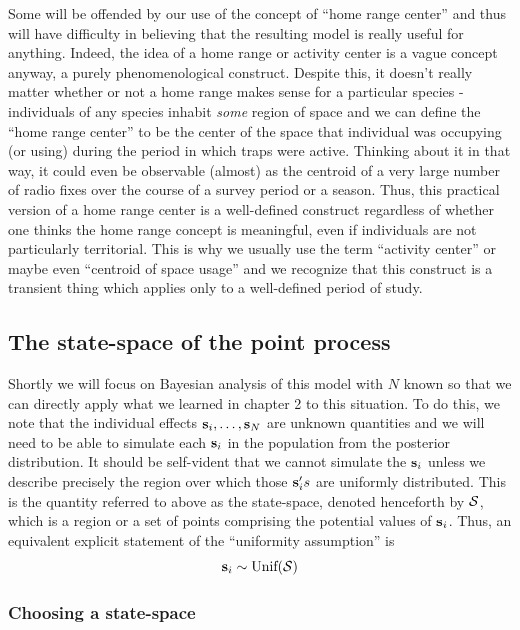 Some will be offended by our use of the concept of ``home range
center'' and thus will have difficulty in believing that the resulting
model is really useful for anything.  Indeed, the idea of a home range
or activity center is a vague concept anyway, a purely
phenomenological construct.  Despite this, it doesn't really matter
whether or not a home range makes sense for a particular species -
individuals of any species inhabit {\it some} region of space and we
can define the ``home range center'' to be the center of the space
that individual was occupying (or using) during the period in which
traps were active. Thinking about it in that way, it could even be
observable (almost) as the centroid of a very large number of radio
fixes over the course of a survey period or a season.  Thus, this
practical version of a home range center is a well-defined construct
regardless of whether one thinks the home range concept is meaningful,
even if individuals are not particularly territorial.  This is why we
usually use the term ``activity center'' or maybe even ``centroid of
space usage'' and we recognize that this construct is a transient
thing which applies only to a well-defined period of
study. 



\subsection{The state-space of the point process}

Shortly we will focus on Bayesian analysis of this model with $N$
known so that we can directly apply what we learned in chapter 2 to
this situation. To do this, we note that the individual effects ${\bf
  s}_{i},\ldots, {\bf s}_{N}$ are unknown quantities and we will need
to be able to simulate each ${\bf s}_{i}$ in the population from the
posterior distribution.  It should be self-vident that we cannot
simulate the ${\bf s}_{i}$ unless we describe precisely the region
over which those ${\bf s}_{i}'s$ are uniformly distributed. This is
the quantity referred to above as the state-space, denoted henceforth
by ${\cal S}$, which is a region or a set of points comprising the
potential values of ${\bf s}_{i}$. Thus, an equivalent explicit
statement of the ``uniformity assumption'' is
\[
{\bf s}_{i} \sim \mbox{Unif}({\cal S})
\]


\subsubsection{Choosing a state-space}

